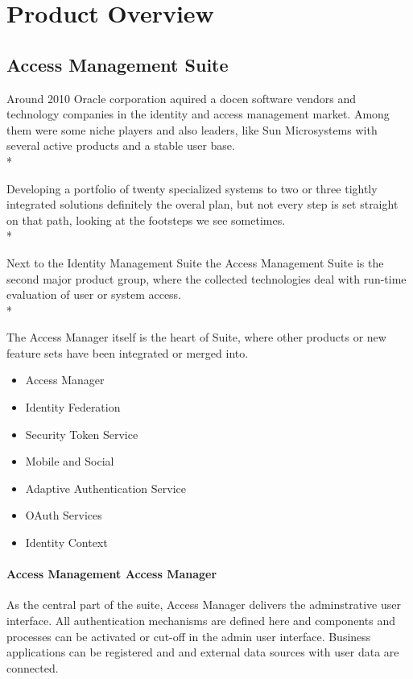 
\chapter[Product Overview]{Product Overview}

\section{Access Management Suite}

Around 2010 Oracle corporation aquired a docen software vendors and
technology companies in the identity and access management market. Among
them were some niche players and also leaders, like Sun Microsystems
with several active products and a stable user base.\\*

Developing a portfolio of twenty specialized systems to two or three
tightly integrated solutions definitely the overal plan, but not every
step is set straight on that path, looking at the footsteps we see
sometimes.\\*

Next to the Identity Management Suite the Access Management Suite is the
second major product group, where the collected technologies deal with
run-time evaluation of user or system access.\\*

The Access Manager itself is the heart of Suite, where other products or
new feature sets have been integrated or merged into.

\begin{itemize}
    \item Access Manager
    \item Identity Federation
    \item Security Token Service
    \item Mobile and Social
    \item Adaptive Authentication Service
    \item OAuth Services
    \item Identity Context
\end{itemize}


\subsubsection{Access Management Access Manager}

As the central part of the suite, Access Manager delivers the
adminstrative user interface. All authentication mechanisms are defined
here and components and processes can be activated or cut-off in the
admin user interface. Business applications can be registered and and
external data sources with user data are connected.

